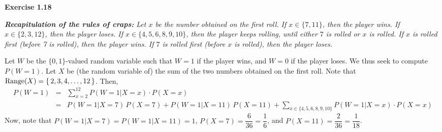 
\noindent
\textbf{Exercise 1.18}

\vskip 0.5cm
\noindent
\textit{\textbf{Recapitulation of the rules of craps:}
Let $x$ be the number obtained on the first roll.
If $x \in \{7, 11\}$, then the player wins.
If $x \in \{ 2,3,12\}$, then the player loses.
If $x \in \{4,5,6,8,9,10\}$, then the player keeps rolling,
until either $7$ is rolled or $x$ is rolled.
If $x$ is rolled first (before 7 is rolled), then the player wins.
If $7$ is rolled first (before $x$ is rolled), then the player loses.
}

\vskip 0.5cm
\noindent
Let $W$ be the $\{0,1\}$-valued random variable such that $W = 1$ if the player wins,
and $W = 0$ if the player loses.  We thus seek to compute $P(W = 1)$.
Let $X$ be (the random variable of) the sum of the two numbers obtained on the first roll.
Note that $\textnormal{Range}(X) = \{\,2,3,4,\ldots,12\,\}$.
Then,
\begin{eqnarray*}
P(W = 1)
& = &
\sum^{12}_{x=2}P(W=1 \vert X = x)\cdot P(X = x) \\
& = &
P(W=1 \vert X = 7)\,P(X = 7) + P(W=1 \vert X = 11)\,P(X = 11) + 
\sum_{x \in \{4,5,6,8,9,10\}}P(W=1 \vert X = x)\cdot P(X = x)
\end{eqnarray*}
Now, note that $P(W = 1 \vert X = 7) = P(W = 1 \vert X = 11) = 1$,
$P(X = 7) = \dfrac{6}{36} = \dfrac{1}{6}$, and
$P(X = 11) = \dfrac{2}{36} = \dfrac{1}{18}$.

